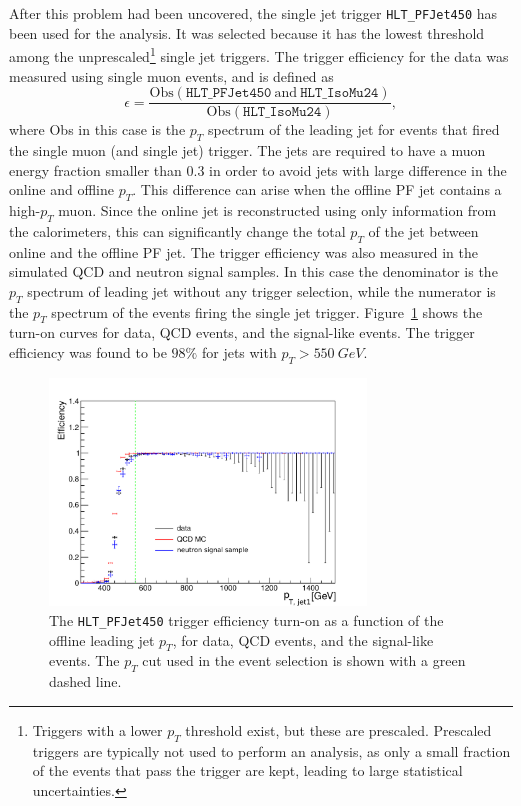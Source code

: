 After this problem had been uncovered, the single jet trigger \texttt{HLT\_PFJet450} has been used for the analysis. It was selected because it has the lowest threshold among the unprescaled\footnote{Triggers with a lower $p_T$ threshold exist, but these are prescaled. Prescaled triggers are typically not used to perform an analysis, as only a small fraction of the events that pass the trigger are kept, leading to large statistical uncertainties.} single jet triggers. The trigger efficiency for the data was measured using single muon events, and is defined as
\begin{equation}
\epsilon = \frac{\mathrm{Obs}(\texttt{HLT\_PFJet450}\ \mathrm{and}\ \texttt{HLT\_IsoMu24})}{\mathrm{Obs}(\texttt{HLT\_IsoMu24})},
\end{equation} 
where Obs in this case is the $p_T$ spectrum of the leading jet for events that fired the single muon (and single jet) trigger. The jets are required to have a muon energy fraction smaller than $0.3$ in order to avoid jets with large difference in the online and offline $p_T$. This difference can arise when the offline \ac{PF} jet contains a high-$p_T$ muon. Since the online jet is reconstructed using only information from the calorimeters, this can significantly change the total $p_T$ of the jet between online and the offline \ac{PF} jet. The trigger efficiency was also measured in the simulated \ac{QCD} and neutron signal samples. In this case the denominator is the $p_T$ spectrum of leading jet without any trigger selection, while the numerator is the $p_T$ spectrum of the events firing the single jet trigger. Figure~\ref{fig:ptturnon} shows the turn-on curves for data, \ac{QCD} events, and the signal-like events. The trigger efficiency was found to be $98\%$ for jets with $p_{T}>\SI{550}{GeV}$.

\begin{figure}[ht]
  \centering
  \includegraphics[width=0.75\textwidth]{figures/trigger/pt_HLT_PFJet450_new.pdf}
  \caption{The \texttt{HLT\_PFJet450} trigger efficiency turn-on as a function of the offline leading jet $p_T$, for data, \ac{QCD} events, and the signal-like events. The $p_T$ cut used in the event selection is shown with a green dashed line.}
  \label{fig:ptturnon}
\end{figure}

